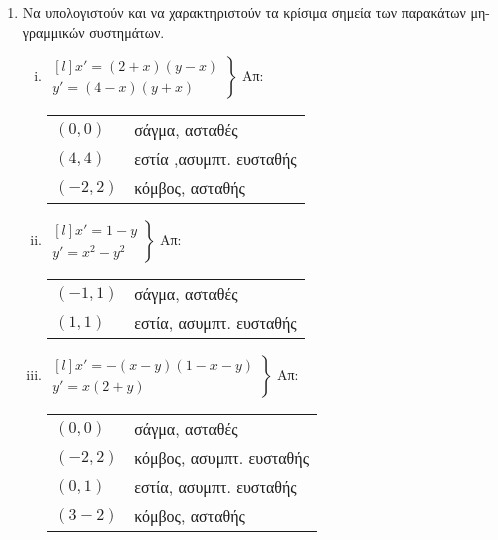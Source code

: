 



\thispagestyle{empty}




\begin{center}
\end{center}

\vspace{\baselineskip}

\begin{enumerate}
    \item Να υπολογιστούν και να χαρακτηριστούν τα κρίσιμα σημεία των παρακάτων 
        μη-γραμμικών συστημάτων.

        \begin{enumerate}[i)]
            \setlength\itemsep{2\baselineskip}
        \item $ 
            \left.
                \begin{matrix*}[l]
                    x' = (2+x)(y-x) \\
                    y' = (4-x)(y+x) 
                \end{matrix*}
            \right\}$ \hfill Απ:  
            \begin{tabular}{ll}
                $ (0,0) $ & σάγμα, ασταθές \\
                $ (4,4) $ & εστία ,ασυμπτ. ευσταθής \\
                $ (-2,2) $ & κόμβος, ασταθής
            \end{tabular} 

        \item $ 
            \left.
                \begin{matrix*}[l]
                    x' = 1-y \\
                    y' = x^{2} - y^{2}
                \end{matrix*}
            \right\}$ \hfill Απ:  
            \begin{tabular}{ll}
                $ (-1,1) $ & σάγμα, ασταθές  \\
                $ (1,1) $ & εστία, ασυμπτ. ευσταθής
            \end{tabular}  

        \item $ 
            \left.
                \begin{matrix*}[l]
                    x' = - (x-y)(1-x-y) \\
                    y' = x(2+y)
                \end{matrix*}
            \right\} $ \hfill Απ: \begin{tabular}{ll}
                $ (0,0) $ & σάγμα, ασταθές \\
                $ (-2,2) $ & κόμβος, ασυμπτ. ευσταθής \\
                $ (0,1) $ & εστία, ασυμπτ. ευσταθής \\
                $ (3 -2) $ & κόμβος, ασταθής
            \end{tabular} 


\end{enumerate}
\end{enumerate}

